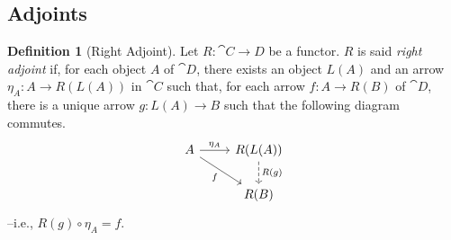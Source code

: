 \documentclass[a4paper, twoside,openright]{report}
\theoremstyle{plain}
\theoremstyle{definition}
\newtheorem{definition}[theorem]{Definition}
\begin{document}
\subsection{Adjoints}



\begin{definition}[Right Adjoint]\label{def:right_adjoint}
    Let $R: \cat{C \rightarrow D}$ be a functor. $R$ is said \emph{right adjoint} if, for each object $A$ of $\cat D$, there exists an object $L(A)$ and an arrow $\eta_A:A \rightarrow R(L(A))$ in $\cat C$ such that, for each arrow $f: A \rightarrow R(B)$ of $\cat D$, there is a unique arrow $g:L(A) \rightarrow B$ such that the following diagram commutes.
    \[
        \begin{tikzcd}
            A \arrow[r, "{\eta_A}"] \arrow[dr, "f" swap] & R(L(A)) \arrow[d, dashed, "R(g)"] \\
            & R(B)
        \end{tikzcd}
    \]
    --i.e., $R(g) \circ \eta_A = f$.
\end{definition}
\end{document}

